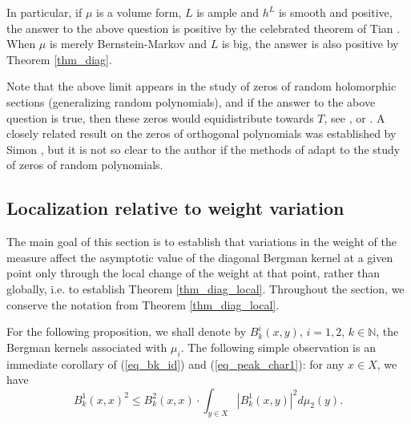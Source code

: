 \documentclass[12pt]{article}
\numberwithin{equation}{section}
\theoremstyle{theorem}
\theoremstyle{definition}
\theoremstyle{remark}
\newcommand{\nat}{\mathbb{N}}
\begin{document}
	In particular, if $\mu$ is a volume form, $L$ is ample and $h^L$ is smooth and positive, the answer to the above question is positive by the celebrated theorem of Tian \cite{TianBerg}. 
	When $\mu$ is merely Bernstein-Markov and $L$ is big, the answer is also positive by Theorem \ref{thm_diag}.
	\par 
	Note that the above limit appears in the study of zeros of random holomorphic sections (generalizing random polynomials), and if the answer to the above question is true, then these zeros would equidistribute towards $T$, see \cite[Lemma 3.1]{ShiffZeldRandom}, \cite[\S 5.3]{MaHol} or \cite{BloomLevRandPoly}.
	A closely related result on the zeros of orthogonal polynomials was established by Simon \cite[Theorem 1.5]{SimonWeakConv}, but it is not so clear to the author if the methods of \cite{SimonWeakConv} adapt to the study of zeros of random polynomials.
	
	
	
	\subsection{Localization relative to weight variation}\label{sect_loc_diag}
	The main goal of this section is to establish that variations in the weight of the measure affect the asymptotic value of the diagonal Bergman kernel at a given point only through the local change of the weight at that point, rather than globally, i.e. to establish Theorem \ref{thm_diag_local}.
	Throughout the section, we conserve the notation from Theorem \ref{thm_diag_local}.
	\par 
	For the following proposition, we shall denote by $B^i_k(x, y)$, $i = 1, 2$, $k \in \nat$, the Bergman kernels associated with $\mu_i$.
	The following simple observation is an immediate corollary of (\ref{eq_bk_id}) and (\ref{eq_peak_char1}): for any $x \in X$, we have
	\begin{equation}\label{eq_berg_ident}
		B^1_k(x, x)^2
		\leq
		B^2_k(x, x)
		\cdot
		\int_{y \in X} |B^1_k(x, y)|^2 d \mu_2(y).
	\end{equation}
	
\end{document}
